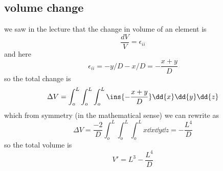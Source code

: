 \subsection{volume change}
we saw in the lecture that the change in volume of an element is 
\begin{equation}
    \frac{dV}{V}=\epsilon_{ii}
\end{equation}
and here 
\begin{equation}
    \epsilon_{ii}=-y/D-x/D=-\frac{x+y}{D}
\end{equation}
so the total change is 
\begin{equation}
    \Delta V = \int_{o}^{L}\int_{o}^{L}\int_{o}^{L}\ins{-\frac{x+y}{D}}\dd{x}\dd{y}\dd{z}
\end{equation}
which from symmetry (in the mathematical sense) we can rewrite as 
\begin{equation}
    \Delta V = \frac{-2}{D}\int_{o}^{L}\int_{o}^{L}\int_{o}^{L}x\dd{x}\dd{y}\dd{z}=-\frac{L^4}{D}
\end{equation}
so the total volume is 
\begin{equation}
    V' = L^3-\frac{L^4}{D}
\end{equation}